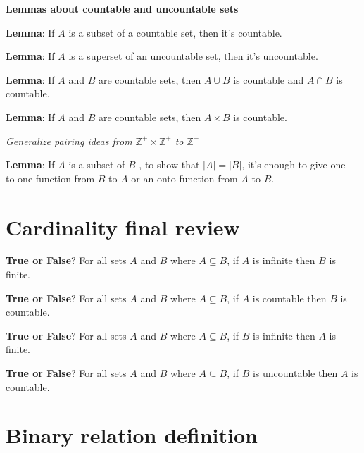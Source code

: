 \documentclass[12pt, oneside]{article}
\begin{document}
{\bf Lemmas about countable and uncountable sets}

{\bf Lemma}: If $A$ is a subset of a countable set, then it's countable.

\vspace{80pt}

{\bf Lemma}: If $A$ is a superset of an uncountable set, then it's uncountable.

\vspace{80pt}

{\bf Lemma}: If $A$ and $B$ are countable sets, then $A \cup B$ is countable
and $A \cap B$ is countable.

\vspace{80pt}

{\bf Lemma}: If $A$ and $B$ are countable sets, then $A \times B$ is countable.

{\it Generalize pairing ideas from $\mathbb{Z}^+ \times \mathbb{Z}^+$ to $\mathbb{Z}^+$}

\vspace{50pt}

{\bf Lemma}: If $A$ is a subset of $B$ , to show that $|A| = |B|$, 
it's enough to give one-to-one function from $B$ to $A$ or an onto function 
from $A$ to $B$.

\vspace{80pt}
 \vfill
\section*{Cardinality final review}


{\bf True or False}?  For all sets $A$ and $B$ where  $A \subseteq B$, 
if $A$ is infinite then $B$ is finite.

\vfill

{\bf True or False}?   For all sets $A$ and $B$ where  $A \subseteq B$, 
if $A$ is countable then $B$ is countable.

\vfill

{\bf True or False}?   For all sets $A$ and $B$ where  $A \subseteq B$, 
if $B$ is infinite then $A$ is finite.

\vfill

{\bf True or False}?   For all sets $A$ and $B$ where  $A \subseteq B$, 
if $B$ is uncountable then $A$ is countable.

\vfill \vfill
\section*{Binary relation definition}
\end{document}
